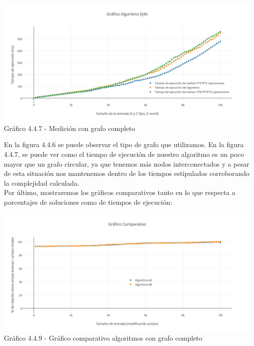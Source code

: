   \vspace*{0.3cm} \vspace*{0.3cm}
  \begin{center}
 \includegraphics[scale=0.28]{./ej4/completo2b.jpg}
 	{Gráfico 4.4.7 - Medición con grafo completo}
  \end{center}
  \vspace*{0.3cm}

En la figura 4.4.6 se puede observar el tipo de grafo que utilizamos. En la figura 4.4.7, se puede ver como el tiempo de ejecución de nuestro algoritmo es un poco mayor que un grafo circular, ya que tenemos más nodos interconectados y a pesar de esta situación nos mantenemos dentro de los tiempos estipulados corroborando la complejidad calculada.\\

Por último, mostraremos los gráficos comparativos tanto en lo que respecta a porcentajes de soluciones como de tiempos de ejecución:\\
  
  \vspace*{0.3cm} \vspace*{0.3cm}
  \begin{center}
 \includegraphics[scale=0.28]{./ej4/comcompleto.jpg}
 	{Gráfico 4.4.9 - Gráfico comparativo algoritmos con grafo completo}
  \end{center}
  \vspace*{0.3cm}
  
